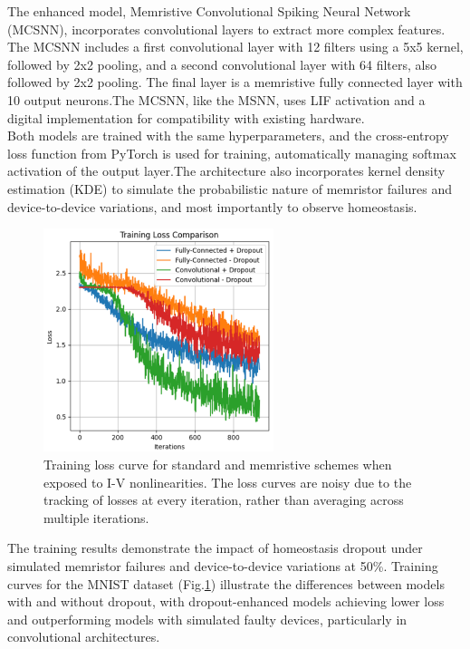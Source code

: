 \noindent The enhanced model, Memristive Convolutional Spiking Neural Network (MCSNN), incorporates convolutional layers to extract more complex features. The MCSNN includes a first convolutional layer with 12 filters using a 5x5 kernel, followed by 2x2 pooling, and a second convolutional layer with 64 filters, also followed by 2x2 pooling. The final layer is a memristive fully connected layer with 10 output neurons.The MCSNN, like the MSNN, uses LIF activation and a digital implementation for compatibility with existing hardware.\\

\noindent Both models are trained with the same hyperparameters, and the cross-entropy loss function from PyTorch is used for training, automatically managing softmax activation of the output layer.The architecture also incorporates kernel density estimation (KDE) to simulate the probabilistic nature of memristor failures and device-to-device variations, and most importantly to observe homeostasis.\\

\begin{figure}[!t]
    \centerline{\includegraphics[width=0.6\textwidth]{Chapter7/Figs/c.png}}
    \caption[Training loss curve for standard and memristive schemes when exposed to I-V nonlinearities]{Training loss curve for standard and memristive schemes when exposed to I-V nonlinearities. The loss curves are noisy due to the tracking of losses at every iteration, rather than averaging across multiple iterations.}
    \label{fig:7c}
\end{figure}


\noindent The training results demonstrate the impact of homeostasis dropout under simulated memristor failures and device-to-device variations at 50\%. Training curves for the MNIST dataset (Fig.\ref{fig:7c}) illustrate the differences between models with and without dropout, with dropout-enhanced models achieving lower loss and outperforming models with simulated faulty devices, particularly in convolutional architectures. \\

